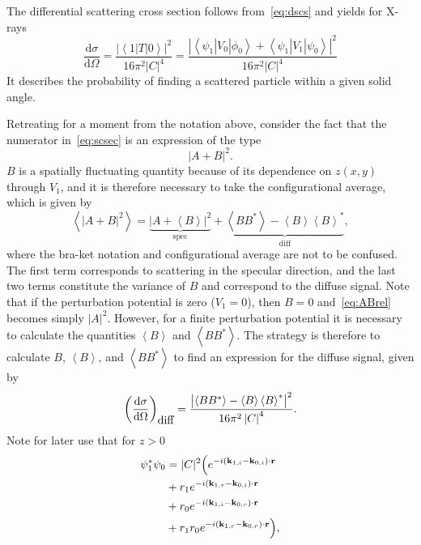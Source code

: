 \documentclass[10pt,twoside, b5paper,pdftex]{report}
\newcommand{\bra}[1]{\ensuremath{\left\langle#1\right|}}
\newcommand{\ket}[1]{\ensuremath{\left|#1\right\rangle}}
\newcommand{\lik}[0]{\ensuremath{&=}}
\begin{document}
%
The differential scattering cross section follows from~\cref{eq:dscs} and yields  for X-rays 
\begin{equation}\label{eq:scsec}
\boxed{\frac{\mbox{d}\sigma}{\mbox{d}\Omega} = \frac{\left|\bra{1}T\ket{0}\right|^{2}}{16\pi^{2} \left|C\right|^{4}} = \frac{\left|\bra{\psi_{1}}V_{0}\ket{\phi_{0}} + \bra{\psi_{1}}V_{1}\ket{\psi_{0}}\right|^{2}}{16\pi^{2} \left|C\right|^{4}}} 
\end{equation}
It describes the probability of finding a scattered particle within a given solid angle. 

Retreating for a moment from the notation above, consider the fact that the numerator in~\cref{eq:scsec} is an expression of the type \[ \left|A+B\right|^{2} . \] $B$ is a spatially fluctuating quantity because of its dependence on $z\left(x,y\right)$ through $V_1$, and it is therefore necessary to take the configurational average, which is given by
%
\begin{equation}\label{eq:ABrel}
	\left\langle \left| A+B \right|^{2} \right\rangle =  \underbrace{\left| A+\left\langle B \right\rangle \right|^{2}}_{\mbox{spec}} +  \underbrace{\left\langle BB^{*} \right\rangle - \left\langle B \right\rangle \left\langle B \right\rangle^{*}}_{\mbox{diff}},
\end{equation}
where the bra-ket notation and configurational average are not to be confused. The first term corresponds to scattering in the specular direction, and the last two terms constitute the variance of $B$ and correspond to the diffuse signal.   Note that if the perturbation potential is zero ($V_{1}=0$), then $B = 0$ and~\cref{eq:ABrel} becomes simply $\left| A \right|^{2}$. However, for a finite perturbation potential it is necessary to calculate the quantities  $\left\langle B \right\rangle$ and  $\left\langle BB^{*} \right\rangle$. The strategy is therefore to calculate $B$, $\left\langle B \right\rangle$, and  $\left\langle BB^{*} \right\rangle$ to find an expression for the diffuse signal, given by
\begin{equation}
\left(\frac{\mbox{d}\sigma}{\mbox{d}\Omega}\right)_{\mbox{diff}} = \frac{\left|\left\langle BB^{*} \right\rangle - \left\langle B \right\rangle \left\langle B \right\rangle^{*}\right|^{2}}{16\pi^{2} \left|C\right|^{4}}. \label{eq:diffsc}\\
\end{equation}
Note for later use that for $z > 0$
\begin{align}\label{eq:psipsi0}
\psi_{1}^{*}\psi_{0} \lik |C|^{2}\Big(e^{-i\left(\mathbf{k}_{1,i}-\mathbf{k}_{0,i}\right)\cdot\mathbf{r}}\notag \\ 
&+ r_{1}e^{-i\left(\mathbf{k}_{1,r}-\mathbf{k}_{0,i}\right)\cdot\mathbf{r}}\notag \\ 
&+ r_{0}e^{-i\left(\mathbf{k}_{1,i}-\mathbf{k}_{0,r}\right)\cdot\mathbf{r}} \\
&+ r_{1}r_{0}e^{-i\left(\mathbf{k}_{1,r}-\mathbf{k}_{0,r}\right)\cdot\mathbf{r}}\Big) ,\notag 
\end{align}
\end{document}
